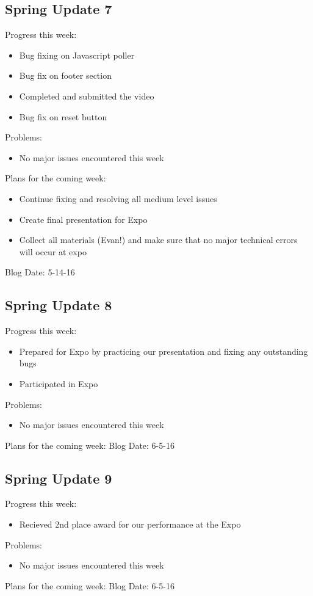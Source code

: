 \subsection{Spring Update 7}
Progress this week:
\begin{itemize}
\item Bug fixing on Javascript poller
\item Bug fix on footer section
\item Completed and submitted the video
\item Bug fix on reset button
\end{itemize}
Problems:
\begin{itemize}
\item No major issues encountered this week
\end{itemize}
Plans for the coming week: 
\begin{itemize}
\item Continue fixing and resolving all medium level issues
\item Create final presentation for Expo
\item Collect all materials (Evan!) and make sure that no major technical errors will occur at expo
\end{itemize}
Blog Date: 5-14-16

\subsection{Spring Update 8}
Progress this week:
\begin{itemize}
\item Prepared for Expo by practicing our presentation and fixing any outstanding bugs
\item Participated in Expo
\end{itemize}
Problems:
\begin{itemize}
\item No major issues encountered this week
\end{itemize}
Plans for the coming week: 
Blog Date: 6-5-16

\subsection{Spring Update 9}
Progress this week:
\begin{itemize}
\item Recieved 2nd place award for our performance at the Expo
\end{itemize}
Problems:
\begin{itemize}
\item No major issues encountered this week
\end{itemize}
Plans for the coming week: 
Blog Date: 6-5-16

